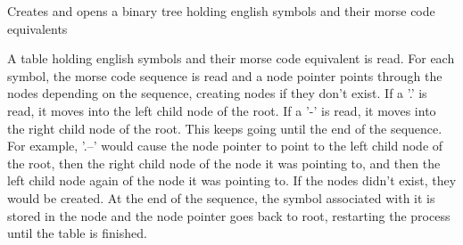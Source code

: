 Creates and opens a binary tree holding english symbols and their morse code equivalents

A table holding english symbols and their morse code equivalent is read. For each symbol, the morse code sequence is read and a node pointer points through the nodes depending on the sequence, creating nodes if they don't exist. If a '.' is read, it moves into the left child node of the root. If a '-\/' is read, it moves into the right child node of the root. This keeps going until the end of the sequence. For example, '.--' would cause the node pointer to point to the left child node of the root, then the right child node of the node it was pointing to, and then the left child node again of the node it was pointing to. If the nodes didn't exist, they would be created. At the end of the sequence, the symbol associated with it is stored in the node and the node pointer goes back to root, restarting the process until the table is finished. 